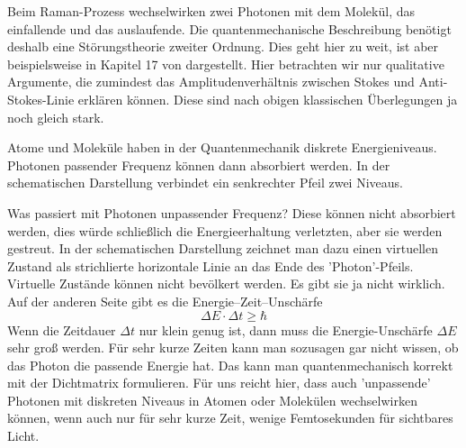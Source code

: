 Beim Raman-Prozess wechselwirken zwei Photonen mit dem Molekül, das einfallende und das auslaufende. Die quantenmechanische Beschreibung benötigt deshalb eine Störungstheorie zweiter Ordnung. Dies geht hier zu weit, ist aber beispielsweise in Kapitel 17 von \cite{Haken_wolf_II} dargestellt. Hier betrachten wir nur qualitative Argumente, die zumindest das Amplitudenverhältnis zwischen Stokes und Anti-Stokes-Linie erklären können. Diese sind nach obigen klassischen Überlegungen ja noch gleich stark.

Atome und Moleküle haben in der Quantenmechanik diskrete Energieniveaus. Photonen passender Frequenz können dann absorbiert werden. In der schematischen Darstellung verbindet ein senkrechter Pfeil zwei Niveaus.

\begin{marginfigure}
\end{marginfigure}
 

Was passiert mit Photonen unpassender Frequenz? Diese können nicht absorbiert werden, dies würde schließlich die Energieerhaltung verletzten, aber sie werden gestreut. In der schematischen Darstellung zeichnet man dazu einen virtuellen Zustand als strichlierte horizontale Linie an das Ende des 'Photon'-Pfeils. Virtuelle Zustände können nicht bevölkert werden. Es gibt sie ja nicht wirklich. Auf der anderen Seite gibt es die Energie--Zeit--Unschärfe
\begin{equation}
\Delta E \cdot \Delta t \ge \hbar
\end{equation}
Wenn die Zeitdauer $\Delta t $ nur klein genug ist, dann muss die Energie-Unschärfe $\Delta E $ sehr groß werden. Für sehr kurze Zeiten kann man sozusagen gar nicht wissen, ob das Photon die passende Energie hat. Das kann man quantenmechanisch korrekt mit der Dichtmatrix formulieren. Für uns reicht hier, dass auch 'unpassende' Photonen mit diskreten Niveaus in Atomen oder Molekülen wechselwirken können, wenn auch nur für sehr kurze Zeit, wenige Femtosekunden für sichtbares Licht.

